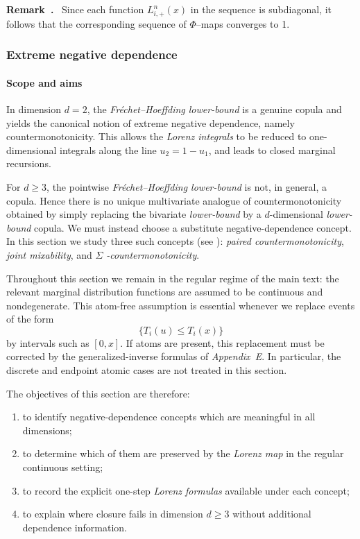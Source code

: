 \documentclass[onecolumn]{article}
\newenvironment{remark}{  \refstepcounter{theorem}  \par\medskip\noindent\textbf{Remark~\thetheorem.}\rmfamily\ }{\par\medskip}
\begin{document}
\begin{remark}
Since each function $L_{i,+}^{n}(x)$ in the sequence is subdiagonal, it
follows that the corresponding sequence of $\Phi $--maps converges to 1.
\end{remark}

\subsubsection{Extreme negative dependence}

\paragraph{Scope and aims}

In dimension $d=2$, the \textit{Fr\'{e}chet--Hoeffding lower-bound} is a
genuine copula and yields the canonical notion of extreme negative
dependence, namely countermonotonicity. This allows the \textit{Lorenz
integrals} to be reduced to one-dimensional integrals along the line $%
u_{2}=1-u_{1}$, and leads to closed marginal recursions.

For $d\geq 3$, the pointwise \textit{Fr\'{e}chet--Hoeffding lower-bound} is
not, in general, a copula. Hence there is no unique multivariate analogue of
countermonotonicity obtained by simply replacing the bivariate \textit{%
lower-bound} by a $d$-dimensional \textit{lower-bound} copula. We must
instead choose a substitute negative-dependence concept. In this section we
study three such concepts (see \cite{[48]}): \textit{paired
countermonotonicity}, \textit{joint mixability}, and $\Sigma $\textit{%
-countermonotonicity}.

Throughout this section we remain in the regular regime of the main text:
the relevant marginal distribution functions are assumed to be continuous
and nondegenerate. This atom-free assumption is essential whenever we
replace events of the form 
\begin{equation*}
\{T_{i}(u)\leq T_{i}(x)\}
\end{equation*}%
by intervals such as $[0,x]$. If atoms are present, this replacement must be
corrected by the generalized-inverse formulas of \textit{Appendix~E}. In
particular, the discrete and endpoint atomic cases are not treated in this
section.

The objectives of this section are therefore:

\begin{enumerate}
\item to identify negative-dependence concepts which are meaningful in all
dimensions;

\item to determine which of them are preserved by the \textit{Lorenz map} in
the regular continuous setting;

\item to record the explicit one-step \textit{Lorenz formulas} available
under each concept;

\item to explain where closure fails in dimension $d\geq 3$ without
additional dependence information.
\end{enumerate}
\end{document}
